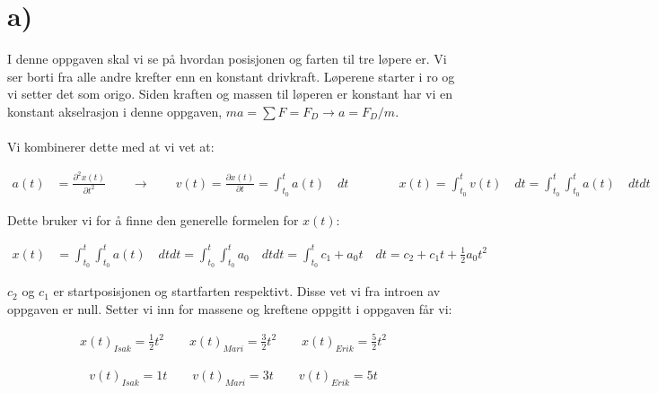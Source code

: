 \pagebreak


\pagebreak



\section*{a)}%

I denne oppgaven skal vi se på hvordan posisjonen og farten til tre løpere er. Vi ser borti fra alle andre krefter
enn en konstant drivkraft. Løperene starter i ro og vi setter det som origo.
Siden kraften og massen til løperen er konstant har vi en konstant akselrasjon
i denne oppgaven, $ma = \sum F = F_D \rightarrow a = F_D/m$.
\\
\\
Vi kombinerer dette med at vi vet at:

\begin{align*}
  a(t) &= \frac{\partial ^2x(t)}{\partial  t^2}
  \qquad \rightarrow \qquad
  v(t) =\frac{\partial x(t)}{\partial  t} = \int_{t_0}^{t}a(t) \quad dt
  \qquad \qquad
  x(t) = \int_{t_0}^{t}v(t) \quad dt  = \int_{t_0}^{t}\int_{t_0}^{t}a(t) \quad dt dt
\end{align*}

Dette bruker vi for å finne den generelle formelen for $x(t)$:

\begin{align*}
  x(t)  &= \int_{t_0}^{t}\int_{t_0}^{t}a(t) \quad dt dt
  = \int_{t_0}^{t}\int_{t_0}^{t}a_0 \quad dt dt
  = \int_{t_0}^{t}c_1  + a_0t \quad dt
  =  c_2 + c_1t + \frac{1}{2}a_0t^2
\end{align*}

$c_2$ og $c_1$ er startposisjonen og startfarten respektivt.
Disse vet vi fra introen av oppgaven er null. Setter vi inn for massene og kreftene oppgitt i oppgaven får vi:

\begin{align}
  x(t)_{Isak} = \frac{1}{2}t^2
  \qquad
  x(t)_{Mari} = \frac{3}{2}t^2
  \qquad
  x(t)_{Erik} = \frac{5}{2}t^2
  \label{eq:test_posisjon}
\end{align}

\begin{align}
  v(t)_{Isak} = 1t
  \qquad
  v(t)_{Mari} = 3t
  \qquad
  v(t)_{Erik} = 5t
  \label{eq:test_fart}
\end{align}

